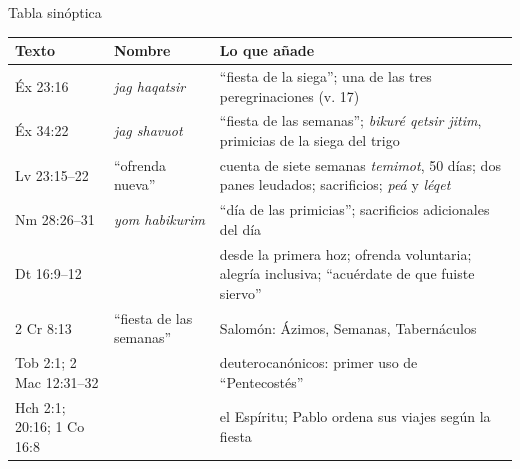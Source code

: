 \begin{frame}{Tabla sinóptica}
\scriptsize\renewcommand{\arraystretch}{1.12}
\begin{tabular}{@{}L{1.9cm}L{3.0cm}L{6.9cm}@{}}
\toprule
\textbf{Texto} & \textbf{Nombre} & \textbf{Lo que añade} \\ \midrule
Éx 23:16 &  \emph{jag haqatsir} & ``fiesta de la siega''; una de las tres peregrinaciones (v. 17) \\
Éx 34:22 &  \emph{jag shavuot} & ``fiesta de las semanas''; \emph{bikuré qetsir jitim}, primicias de la siega del trigo \\
Lv 23:15--22 & ``ofrenda nueva'' & cuenta de siete semanas \emph{temimot}, 50 días; dos panes leudados; sacrificios; \emph{peá} y \emph{léqet} \\
Nm 28:26--31 &  \emph{yom habikurim} & ``día de las primicias''; sacrificios adicionales del día \\
Dt 16:9--12 &  & desde la primera hoz; ofrenda voluntaria; alegría inclusiva; ``acuérdate de que fuiste siervo'' \\
2 Cr 8:13 & ``fiesta de las semanas'' & Salomón: Ázimos, Semanas, Tabernáculos \\
Tob 2:1; 2 Mac 12:31--32 &  & deuterocanónicos: primer uso de ``Pentecostés'' \\
Hch 2:1; 20:16; 1 Co 16:8 &  & el Espíritu; Pablo ordena sus viajes según la fiesta \\
\bottomrule
\end{tabular}\par\smallskip
{}
\end{frame}

